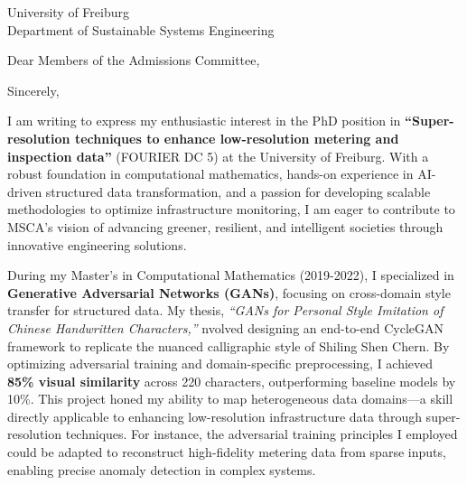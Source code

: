 \documentclass[11pt,a4paper, final]{moderncv}
\begin{document}
{University of Freiburg\\
Department of Sustainable Systems Engineering
}
\date{\today}
\opening{Dear Members of the Admissions Committee,}
\closing{Sincerely,}
\makelettertitle
\thispagestyle{empty}
\pagestyle{empty}
I am writing to express my enthusiastic interest in the PhD position 
in \textbf{``Super-resolution techniques to enhance low-resolution metering and inspection data''} (FOURIER DC 5) 
at the University of Freiburg. 
With a robust foundation in computational mathematics, 
hands-on experience in AI-driven structured data transformation, 
and a passion for developing scalable methodologies to optimize infrastructure monitoring, 
I am eager to contribute to MSCA's vision of advancing greener, resilient, 
and intelligent societies through innovative engineering solutions.

During my Master's in Computational Mathematics (2019-2022), 
I specialized in \textbf{Generative Adversarial Networks (GANs)}, 
focusing on cross-domain style transfer for structured data. 
My thesis, \emph{``GANs for Personal Style Imitation of Chinese Handwritten Characters,''} 
nvolved designing an end-to-end CycleGAN framework to replicate the nuanced calligraphic style of Shiling Shen Chern. 
By optimizing adversarial training and domain-specific preprocessing, 
I achieved \textbf{85\% visual similarity} across 220 characters, outperforming baseline models by 10\%. 
This project honed my ability to map heterogeneous data domains—a skill directly applicable to enhancing low-resolution infrastructure data through super-resolution techniques.
For instance, the adversarial training principles I employed could be adapted to reconstruct high-fidelity metering data from sparse inputs, enabling precise anomaly detection in complex systems.
\end{document}

